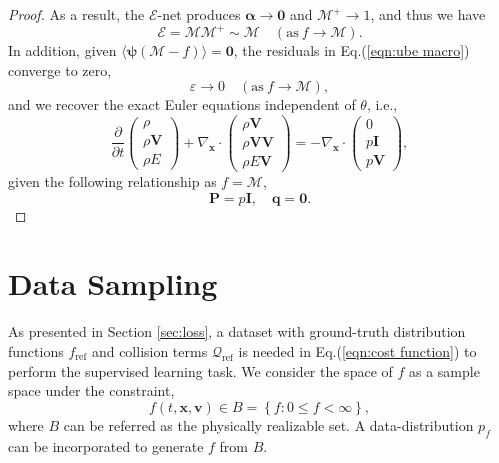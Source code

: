 \documentclass[preprint,3p,12pt,sort&compress]{elsarticle}
\begin{document}
\begin{proof}
As a result, the $\mathcal E$-net produces $\boldsymbol\alpha \rightarrow \mathbf 0$ and $\mathcal M^+ \rightarrow 1$,
and thus we have
\begin{equation}
    \mathcal E = \mathcal M \mathcal M^+ \sim \mathcal M \quad (\mathrm{as} \ f \rightarrow \mathcal M).
\end{equation}
In addition, given $\langle \boldsymbol\psi (\mathcal M - f)\rangle=\mathbf 0$, the residuals in Eq.(\ref{eqn:ube macro}) converge to zero,
\begin{equation}
    \varepsilon \rightarrow 0 \quad (\mathrm{as} \ f \rightarrow \mathcal M),
\end{equation}
and we recover the exact Euler equations independent of $\theta$, i.e.,
\begin{equation}
    \frac{\partial}{\partial t}\left(\begin{array}{c}
    \rho \\
    \rho \mathbf{V} \\
    \rho E
    \end{array}\right)+\nabla_{\mathbf{x}} \cdot\left(\begin{array}{c}
    \rho \mathbf{V} \\
    \rho \mathbf{V} \mathbf{V} \\
    \rho E \mathbf{V}
    \end{array}\right) = -\nabla_\mathbf x \cdot
    \left(\begin{array}{c}
    0 \\
    p\mathbf I \\
    p\mathbf V
    \end{array}\right),
\end{equation}
given the following relationship as $f=\mathcal M$,
\begin{equation}
    \mathbf P = p\mathbf I,\quad \mathbf q = \mathbf 0.
\end{equation}
\end{proof}

\section{Data Sampling}\label{sec:data}

As presented in Section \ref{sec:loss}, a dataset with ground-truth distribution functions $f_\mathrm{ref}$ and collision terms $\mathcal Q_\mathrm{ref}$ is needed in Eq.(\ref{eqn:cost function}) to perform the supervised learning task.
We consider the space of $f$ as a sample space under the constraint,
\begin{equation}
    f(t,\mathbf x,\mathbf v)\in B = \left\{ f: 0\leq f < \infty \right\},
\end{equation}
where $B$ can be referred as the physically realizable set.
A data-distribution $p_f$ can be incorporated to generate $f$ from $B$.
\end{document}
